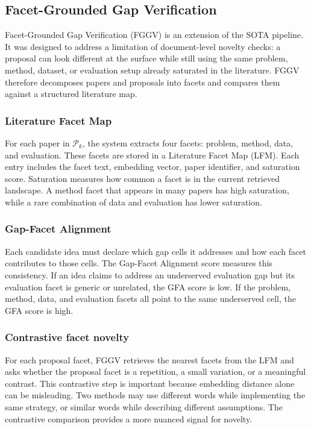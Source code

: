 \documentclass[preprint,12pt]{elsarticle}
\begin{document}
\subsection{Facet-Grounded Gap Verification}
\label{subsec:fggv}

Facet-Grounded Gap Verification (FGGV) is an extension of the SOTA pipeline. It was designed to address a limitation of document-level novelty checks: a proposal can look different at the surface while still using the same problem, method, dataset, or evaluation setup already saturated in the literature. FGGV therefore decomposes papers and proposals into facets and compares them against a structured literature map.

\subsubsection{Literature Facet Map}

For each paper in $\mathcal{P}_k$, the system extracts four facets: problem, method, data, and evaluation. These facets are stored in a Literature Facet Map (LFM). Each entry includes the facet text, embedding vector, paper identifier, and saturation score. Saturation measures how common a facet is in the current retrieved landscape. A method facet that appears in many papers has high saturation, while a rare combination of data and evaluation has lower saturation.

\subsubsection{Gap-Facet Alignment}

Each candidate idea must declare which gap cells it addresses and how each facet contributes to those cells. The Gap-Facet Alignment score measures this consistency. If an idea claims to address an underserved evaluation gap but its evaluation facet is generic or unrelated, the GFA score is low. If the problem, method, data, and evaluation facets all point to the same underserved cell, the GFA score is high.

\subsubsection{Contrastive facet novelty}

For each proposal facet, FGGV retrieves the nearest facets from the LFM and asks whether the proposal facet is a repetition, a small variation, or a meaningful contrast. This contrastive step is important because embedding distance alone can be misleading. Two methods may use different words while implementing the same strategy, or similar words while describing different assumptions. The contrastive comparison provides a more nuanced signal for novelty.
\end{document}
